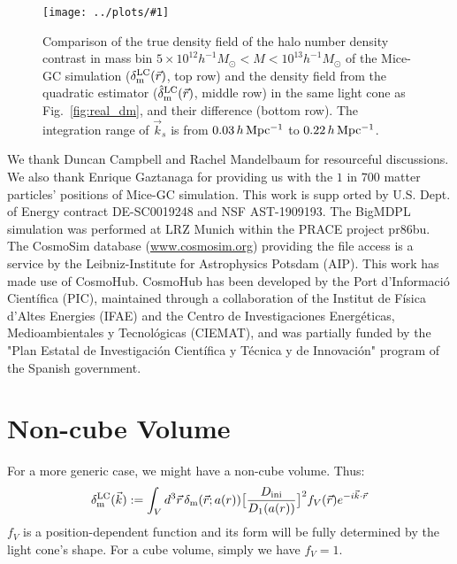 \documentclass[prd,amsmath,amssymb,floatfix,superscriptaddress,nofootinbib,twocolumn]{revtex4-1}
\def\be{\begin{equation}}
\def\ee{\end{equation}}
\newcommand{\LC}{\rm LC}
\newcommand{\ini}{\rm ini}
\newcommand{\vrr}{\vec{r}}
\newcommand{\vk}{\vec{k}}
\newcommand{\rf}[1]{\ref{fig:#1}}
\newcommand{\sfig}[2]{
\texttt{[image: ../plots/\#1]}
        }
\newcommand{\Sfig}[2]{
   \begin{figure}[thbp]
   \begin{center}
    \sfig{../plots/#1.pdf}{\columnwidth}
    \caption{{\small #2}}
    \label{fig:#1}
     \end{center}
   \end{figure}
}
\begin{document}
\Sfig{real_halo}{Comparison of the true density field of the halo number density contrast in mass bin $5 \times 10^{12}h^{-1}M_{\odot}<M < 10^{13}h^{-1}M_{\odot}$ of the Mice-GC simulation ($\delta^{\rm LC}_{\rm m}(\vrr)$, top row) and the density field from the quadratic estimator ($\hat{\delta}_{\rm m}^{\rm LC}(\vrr)$, middle row) in the same light cone as Fig.~\rf{real_dm}, and their difference (bottom row). The integration range of $\vk_{s}$ is from $0.03\, h \rm \, Mpc^{-1}$ to $0.22\, h \rm \, Mpc^{-1}$.} 


\acknowledgements
We thank Duncan Campbell and Rachel Mandelbaum for resourceful discussions. We also thank Enrique Gaztanaga for providing us with the $1$ in $700$ matter particles' positions of Mice-GC simulation. This work is supp orted by U.S. Dept. of Energy contract DE-SC0019248 and NSF AST-1909193.
The BigMDPL simulation was performed at LRZ Munich within the PRACE project pr86bu. The CosmoSim database (\url{www.cosmosim.org}) providing the file access is a service by the Leibniz-Institute for Astrophysics Potsdam (AIP).
This work has made use of CosmoHub. CosmoHub has been developed by the Port d'Informació Científica (PIC), maintained through a collaboration of the Institut de Física d'Altes Energies (IFAE) and the Centro de Investigaciones Energéticas, Medioambientales y Tecnológicas (CIEMAT), and was partially funded by the "Plan Estatal de Investigación Científica y Técnica y de Innovación" program of the Spanish government.
\clearpage


\appendix

\section{Non-cube Volume}
For a more generic case, we might have a non-cube volume. Thus:
\be
\delta^{\LC}_{\rm m}(\vk) :=\int_{V} d^3\vrr  \, \delta_{\rm m}(\vrr;a(r))\big[ \frac{D_{\ini}}{D_{1}(a(r))} \big]^{2}f_{V}(\vrr) e^{-i\vk \cdot\vrr}
\ee
 $f_{V}$ is a position-dependent function and its form will be fully determined by the light cone's shape. For a cube volume, simply we have $f_V=1$.
\end{document}
